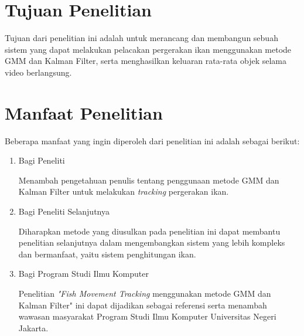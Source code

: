 \section{Tujuan Penelitian}
    Tujuan dari penelitian ini adalah untuk merancang dan membangun sebuah sistem yang dapat melakukan pelacakan pergerakan ikan menggunakan metode GMM dan Kalman Filter, serta menghasilkan keluaran rata-rata objek selama video berlangsung.


\section{Manfaat Penelitian}
    Beberapa manfaat yang ingin diperoleh dari penelitian ini adalah sebagai berikut:
    \begin{enumerate}[listparindent=0.7cm]
        \item Bagi Peneliti
        
        Menambah pengetahuan penulis tentang penggunaan metode GMM dan Kalman Filter untuk melakukan \emph{tracking} pergerakan ikan.
        
        \item Bagi Peneliti Selanjutnya
        
        Diharapkan metode yang diusulkan pada penelitian ini dapat membantu penelitian selanjutnya dalam mengembangkan sistem yang lebih kompleks dan bermanfaat, yaitu sistem penghitungan ikan.
        
        \item Bagi Program Studi Ilmu Komputer
        
        Penelitian \emph{"Fish Movement Tracking} menggunakan metode GMM dan Kalman Filter" ini dapat dijadikan sebagai referensi serta menambah wawasan masyarakat Program Studi Ilmu Komputer Universitas Negeri Jakarta.
    \end{enumerate}


\begin{comment}

\end{comment}
